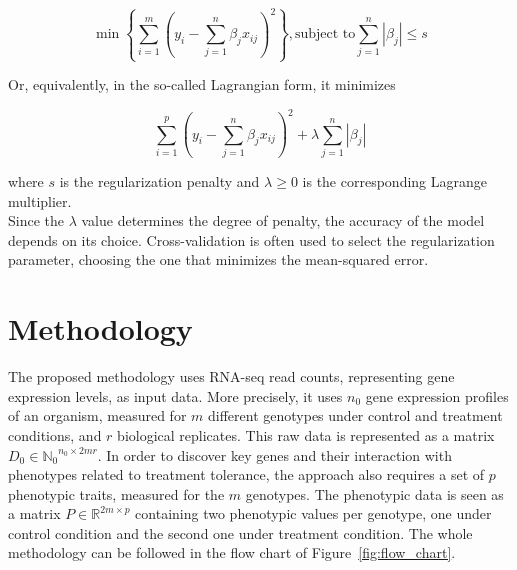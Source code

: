 \documentclass[12pt,journal, onecolumn]{IEEEtran}
\newcommand{\abs}[1]{\left\vert#1\right\vert}
\begin{document}
\begin{equation}
\min \left\lbrace\sum_{i=1}^{m}{\left( y_i-\sum_{j=1}^n{\beta_j x_{ij}}\right)^2} \right\rbrace , \textrm{subject to} \sum_{j=1}^n\abs{\beta_j}\leq s
\end{equation}

Or, equivalently, in the so-called Lagrangian form, it minimizes

\begin{equation}
\sum_{i=1}^{p}{\left( y_i-\sum_{j=1}^n{\beta_j x_{ij}}\right)^2} + \lambda \sum_{j=1}^n\abs{\beta_j}
\end{equation}

where $s$ is the regularization penalty and $\lambda \geq 0$ is the corresponding Lagrange multiplier.\\



Since the $\lambda$ value determines the degree of penalty, the accuracy of the model depends on its choice. Cross-validation is often used to select the regularization parameter, choosing the one that minimizes the mean-squared error.\\

\section{Methodology}

The proposed methodology uses RNA-seq read counts, representing gene expression levels, as input data. More precisely, it uses $n_0$ gene expression profiles of an organism, measured for $m$ different genotypes under control and treatment conditions, and $r$ biological replicates. This raw data is represented as a matrix $D_0 \in {\mathbb{N}_0}^{n_0 \times 2mr}$. In order to discover key genes and their interaction with phenotypes related to treatment tolerance, the approach also requires a set of $p$ phenotypic traits, measured for the $m$ genotypes. The phenotypic data is seen as a matrix $P \in \mathbb{R}^{2m \times p}$ containing two phenotypic values per genotype, one under control condition and the second one under treatment condition. The whole methodology can be followed in the flow chart of Figure~\ref{fig:flow_chart}.\\
\end{document}
